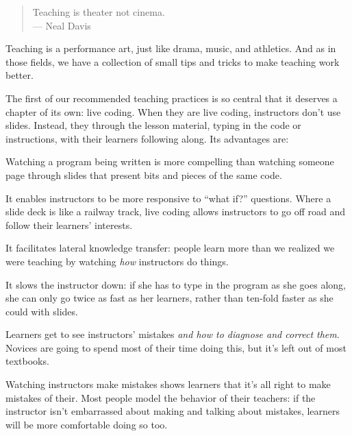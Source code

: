 
\begin{quote}
  Teaching is theater not cinema.
  \\
  --- Neal Davis
\end{quote}

Teaching is a performance art, just like drama, music, and athletics.
And as in those fields, we have a collection of small tips and tricks
to make teaching work better.

The first of our recommended teaching practices is so central that it
deserves a chapter of its own: live coding.  When they are live
coding, instructors don't use slides.  Instead, they through the
lesson material, typing in the code or instructions, with their
learners following along.  Its advantages are:

\begin{gitemize}

\item
  Watching a program being written is more compelling than watching
  someone page through slides that present bits and pieces of the same
  code.

\item
  It enables instructors to be more responsive to ``what if?''
  questions. Where a slide deck is like a railway track, live coding
  allows instructors to go off road and follow their learners'
  interests.

\item
  It facilitates lateral knowledge transfer: people learn more than we
  realized we were teaching by watching \emph{how} instructors do
  things.

\item
  It slows the instructor down: if she has to type in the program as
  she goes along, she can only go twice as fast as her learners,
  rather than ten-fold faster as she could with slides.

\item
  Learners get to see instructors' mistakes \emph{and how to diagnose
  and correct them}. Novices are going to spend most of their time
  doing this, but it's left out of most textbooks.

\item
  Watching instructors make mistakes shows learners that it's all
  right to make mistakes of their.  Most people model the behavior of
  their teachers: if the instructor isn't embarrassed about making and
  talking about mistakes, learners will be more comfortable doing so
  too.

\end{gitemize}

